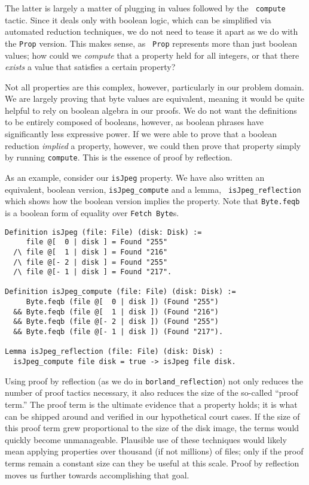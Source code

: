 \documentclass[nocopyrightspace,preprint]{sigplanconf}
\begin{document}
The latter is largely a matter of plugging in values followed by the {\tt
compute} tactic. Since it deals only with boolean logic, which can be
simplified via automated reduction techniques\cite{coq-cbv}, we do not need to
tease it apart as we do with the {\tt Prop} version. This makes sense, as {\tt
Prop} represents more than just boolean values; how could we {\em compute}
that a property held for all integers, or that there {\em exists} a value that
satisfies a certain property?

Not all properties are this complex, however, particularly in our problem
domain. We are largely proving that byte values are equivalent, meaning it
would be quite helpful to rely on boolean algebra in our proofs. We do not
want the definitions to be entirely composed of booleans, however, as boolean
phrases have significantly less expressive power. If we were able to prove
that a boolean reduction {\em implied} a property, however, we could then
prove that property simply by running {\tt compute}. This is the essence of
proof by reflection. 

As an example, consider our {\tt isJpeg} property. We have also written an
equivalent, boolean version, {\tt isJpeg\_compute} and a lemma, {\tt
isJpeg\_reflection} which shows how the boolean version implies the property.
Note that {\tt Byte.feqb} is a boolean form of equality over {\tt Fetch
Byte}s.

\begin{lstlisting}
Definition isJpeg (file: File) (disk: Disk) :=
     file @[  0 | disk ] = Found "255"
  /\ file @[  1 | disk ] = Found "216"
  /\ file @[- 2 | disk ] = Found "255"
  /\ file @[- 1 | disk ] = Found "217".

Definition isJpeg_compute (file: File) (disk: Disk) :=
     Byte.feqb (file @[  0 | disk ]) (Found "255")
  && Byte.feqb (file @[  1 | disk ]) (Found "216")
  && Byte.feqb (file @[- 2 | disk ]) (Found "255")
  && Byte.feqb (file @[- 1 | disk ]) (Found "217").

Lemma isJpeg_reflection (file: File) (disk: Disk) :
  isJpeg_compute file disk = true -> isJpeg file disk.
\end{lstlisting}

Using proof by reflection (as we do in {\tt borland\_reflection}) not only
reduces the number of proof tactics necessary, it also reduces the size of the
so-called ``proof term.'' The proof term is the ultimate evidence that a
property holds; it is what can be shipped around and verified in our
hypothetical court cases. If the size of this proof term grew proportional to
the size of the disk image, the terms would quickly become unmanageable. Plausible use of these techniques would likely mean applying properties over
thousand (if not millions) of files; only if the proof terms remain a constant
size can they be useful at this scale. Proof by reflection moves us further
towards accomplishing that goal.
\end{document}
